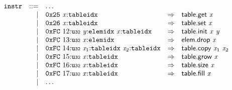 $$
\begin{array}{@{}l@{}rrlll@{}l@{}}
& {\mathtt{instr}} &::=& \dots \\ &&|&
\mathtt{0x25}~{\mathit{x}}{:}{\mathtt{tableidx}} &\Rightarrow& \mathsf{table.get}~{\mathit{x}} \\ &&|&
\mathtt{0x26}~{\mathit{x}}{:}{\mathtt{tableidx}} &\Rightarrow& \mathsf{table.set}~{\mathit{x}} \\ &&|&
\mathtt{0xFC}~12{:}{\mathtt{u{\scriptstyle32}}}~{\mathit{y}}{:}{\mathtt{elemidx}}~{\mathit{x}}{:}{\mathtt{tableidx}} &\Rightarrow& \mathsf{table.init}~{\mathit{x}}~{\mathit{y}} \\ &&|&
\mathtt{0xFC}~13{:}{\mathtt{u{\scriptstyle32}}}~{\mathit{x}}{:}{\mathtt{elemidx}} &\Rightarrow& \mathsf{elem.drop}~{\mathit{x}} \\ &&|&
\mathtt{0xFC}~14{:}{\mathtt{u{\scriptstyle32}}}~{\mathit{x}}_{{1}}{:}{\mathtt{tableidx}}~{\mathit{x}}_{{2}}{:}{\mathtt{tableidx}} &\Rightarrow& \mathsf{table.copy}~{\mathit{x}}_{{1}}~{\mathit{x}}_{{2}} \\ &&|&
\mathtt{0xFC}~15{:}{\mathtt{u{\scriptstyle32}}}~{\mathit{x}}{:}{\mathtt{tableidx}} &\Rightarrow& \mathsf{table.grow}~{\mathit{x}} \\ &&|&
\mathtt{0xFC}~16{:}{\mathtt{u{\scriptstyle32}}}~{\mathit{x}}{:}{\mathtt{tableidx}} &\Rightarrow& \mathsf{table.size}~{\mathit{x}} \\ &&|&
\mathtt{0xFC}~17{:}{\mathtt{u{\scriptstyle32}}}~{\mathit{x}}{:}{\mathtt{tableidx}} &\Rightarrow& \mathsf{table.fill}~{\mathit{x}} \\ &&|&
\dots \\
\end{array}
$$

\vspace{1ex}

